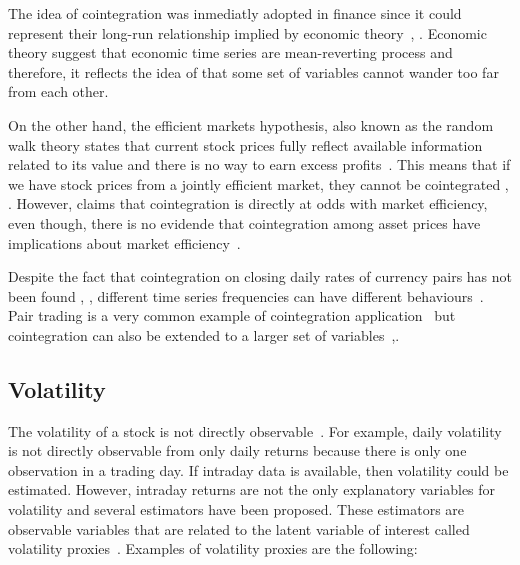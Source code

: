 The idea of cointegration was inmediatly adopted in finance since it could
represent their long-run relationship implied by economic
theory~\cite{laietAl1991}, \cite{lence+falk2005}.  Economic theory suggest that
economic time series are mean-reverting process and therefore, it reflects the
idea of that some set of variables cannot wander too far from each other. 

On the other hand, the efficient markets hypothesis, also known as the random
walk theory states that current stock prices fully reflect available information
related to its value and there is no way to earn excess profits~\cite{fama1970}.
This means that if we have stock prices from a jointly efficient market, they
cannot be cointegrated \cite{granger1986}, \cite{dwyer1992}. However,
\cite{richards1995} claims that cointegration is directly at odds with market
efficiency, even though, there is no evidende that cointegration among asset
prices have implications about market efficiency~\cite{lence+falk2005}.

Despite the fact that cointegration on closing daily rates of currency pairs has
not been found \cite{coleman1990}, \cite{copeland1991}, different time series
frequencies can have different behaviours~\cite{aldridge2009}. Pair trading is a
very common example of cointegration application~\cite{herlemont2003} but
cointegration can also be extended to a larger set of
variables~\cite{mukherjee1995},\cite{engle2004}.



\subsection{Volatility}

The volatility of a stock is not directly observable~\cite{tsay2005,engle1993}.
For example, daily volatility is not directly observable from only daily returns
because there is only one observation in a trading day.  If intraday data is
available, then volatility could be estimated. However, intraday returns are not
the only explanatory variables for volatility and several estimators have been
proposed. These estimators are observable variables that are related to the
latent variable of interest called volatility proxies~\cite{devilderetal2007}.
Examples of volatility proxies are the following: 


